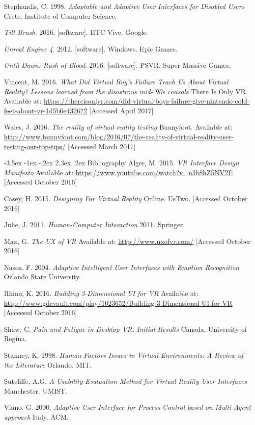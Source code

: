 \documentclass[12pt]{article}
\makeatletter
\renewcommand{\section}{\@startsection {section}{1}{\z@}%
             {-3.5ex \@plus -1ex \@minus -.2ex}%
             {2.3ex \@plus .2ex}%
             {\normalfont\Large\scshape\bfseries}}
\makeatother
\begin{document}
Stephandis, C. 1998. \emph{Adaptable and Adaptive User Interfaces for Disabled Users} Crete. Institute of Computer Science.

\emph{Tilt Brush}. 2016. [software]. HTC Vive. Google. 

\emph{Unreal Engine 4}. 2012. [software]. Windows. Epic Games. 

\emph{Until Dawn: Rush of Blood}. 2016. [software]. PSVR. Super Massive Games.

Vincent, M. 2016. \emph{What Did Virtual Boy’s Failure Teach Us About Virtual Reality?
Lessons learned from the disastrous mid-’90s console} There Is Only VR. Available at: \url{https://thereisonlyr.com/did-virtual-boys-failure-give-nintendo-cold-feet-about-vr-1d5b6e432672} [Accessed April 2017]

Wales, J. 2016. \emph{The reality of virtual reality testing} Bunnyfoot. Available at: \url{http://www.bunnyfoot.com/blog/2016/07/the-reality-of-virtual-reality-user-testing-our-top-tips/} [Accessed March 2017]




\section{Bibliography}
Alger, M. 2015. \emph{VR Interface Design Manifesto} Available at: \url{https://www.youtube.com/watch?v=n3b8hZ5NV2E} [Accessed October 2016]

Casey, H. 2015. \emph{Designing For Virtual Reality} Online. UsTwo. [Accessed October 2016]

Julie, J. 2011. \emph{Human-Computer Interaction} 2011. Springer. 

Max, G. \emph{The UX of VR} Available at: \url{http://www.uxofvr.com/} [Accessed October 2016]

Nasoz, F. 2004. \emph{Adaptive Intelligent User Interfaces with Emotion Recognition} Orlando State University. 

Rhino, K. 2016. \emph{Building 3-Dimensional UI for VR} Available at: \url{http://www.gdcvault.com/play/1023652/Building-3-Dimensional-UI-for-VR} [Accessed October 2016]

Shaw, C. \emph{Pain and Fatigue in Desktop VR: Initial Results} Canada. University of Regina. 

Stanney, K. 1998. \emph{Human Factors Issues in Virtual Environments: A Review of the Literature} Orlando. MIT. 

Sutcliffe, A.G. \emph{A Usability Evaluation Method for Virtual Reality User Interfaces} Manchester. UMIST. 

Viano, G. 2000. \emph{Adaptive User Interface for Process Control based on Multi-Agent approach} Italy. ACM. 
\end{document}
